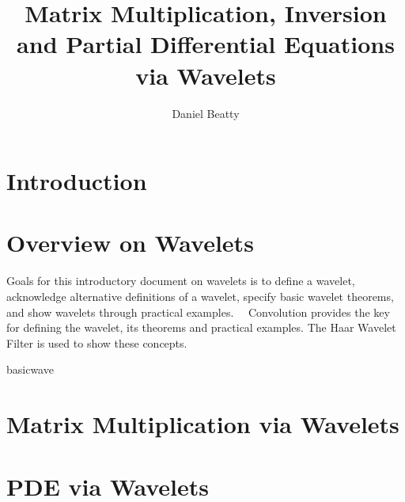 \documentclass[11pt]{report}
\title{Matrix Multiplication, Inversion and Partial Differential Equations via Wavelets}
\author{Daniel Beatty}
\begin{document}
\maketitle \newpage

\tableofcontents \newpage

\chapter{Introduction}


\chapter {Overview on Wavelets}
Goals for this introductory document on wavelets is to define a wavelet,
acknowledge alternative definitions of a wavelet, specify basic wavelet
theorems, and show wavelets through practical examples. \ \ Convolution provides the key for defining the wavelet, its theorems and practical examples.  The Haar Wavelet Filter is used to show these concepts.  

 {basicwave}

\chapter {Matrix Multiplication via Wavelets}



%

\chapter {PDE via Wavelets}


\appendix

\end{document}
